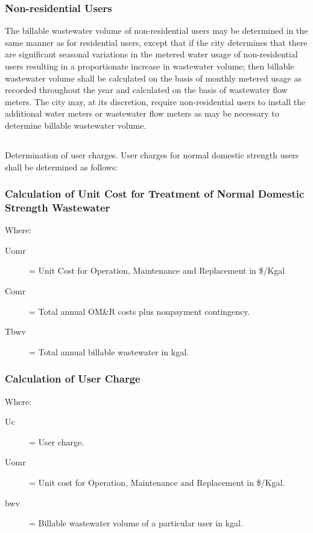 \subsubsection{Non-residential Users}
The billable wastewater volume of non-residential users may be determined in the same manner as for residential users, except that if the city determines that there are significant seasonal variations in the metered water usage of non-residential users resulting in a proportionate increase in wastewater volume; then billable wastewater volume shall be calculated on the basis of monthly metered usage as recorded throughout the year and calculated on the basis of wastewater flow meters.  The city may, at its discretion, require non-residential users to install the additional water meters or wastewater flow meters as may be necessary to determine billable wastewater volume.
\subsection{}
Determination of user charges.  User charges for normal domestic strength users shall be determined as follows:
\subsubsection{Calculation of Unit Cost for Treatment of Normal Domestic Strength Wastewater}
Where:
\begin{description}
\item[Uomr] = Unit Cost for Operation, Maintenance and Replacement in \$/Kgal
\item[Comr] = Total annual OM\&R costs plus nonpayment contingency.
\item[Tbwv] = Total annual billable wastewater in kgal.
\end{description}
\subsubsection{Calculation of User Charge}
Where:
\begin{description}
\item[Uc] = User charge.
\item[Uomr] = Unit cost for Operation, Maintenance and Replacement in \$/Kgal.
\item[bwv] = Billable wastewater volume of a particular user in kgal.
\end{description}
